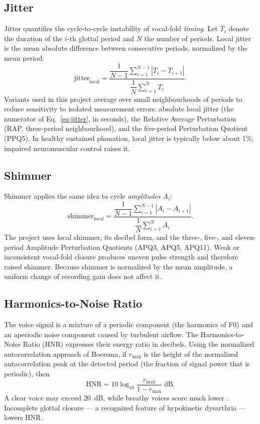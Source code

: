 \subsection{Jitter}

Jitter quantifies the cycle-to-cycle instability of vocal-fold
\emph{timing}. Let $T_i$ denote the duration of the $i$-th glottal
period and $N$ the number of periods. Local jitter is the mean absolute
difference between consecutive periods, normalized by the mean period:
\begin{equation}
\mathrm{jitter}_{\mathrm{local}} =
\frac{\dfrac{1}{N-1}\displaystyle\sum_{i=1}^{N-1}\left|T_i - T_{i+1}\right|}
     {\dfrac{1}{N}\displaystyle\sum_{i=1}^{N} T_i}.
\label{eq:jitter}
\end{equation}
Variants used in this project average over small neighbourhoods of
periods to reduce sensitivity to isolated measurement errors: absolute
local jitter (the numerator of Eq.~\ref{eq:jitter}, in seconds), the
Relative Average Perturbation (RAP, three-period neighbourhood), and
the five-period Perturbation Quotient (PPQ5). In healthy sustained
phonation, local jitter is typically below about 1\%; impaired
neuromuscular control raises it.

\subsection{Shimmer}

Shimmer applies the same idea to cycle \emph{amplitudes} $A_i$:
\begin{equation}
\mathrm{shimmer}_{\mathrm{local}} =
\frac{\dfrac{1}{N-1}\displaystyle\sum_{i=1}^{N-1}\left|A_i - A_{i+1}\right|}
     {\dfrac{1}{N}\displaystyle\sum_{i=1}^{N} A_i}.
\label{eq:shimmer}
\end{equation}
The project uses local shimmer, its decibel form, and the three-, five-,
and eleven-period Amplitude Perturbation Quotients (APQ3, APQ5, APQ11).
Weak or inconsistent vocal-fold closure produces uneven pulse strength
and therefore raised shimmer. Because shimmer is normalized by the mean
amplitude, a uniform change of recording gain does not affect it.

\subsection{Harmonics-to-Noise Ratio}

The voice signal is a mixture of a periodic component (the harmonics of
F0) and an aperiodic noise component caused by turbulent airflow. The
Harmonics-to-Noise Ratio (HNR) expresses their energy ratio in
decibels. Using the normalized autocorrelation approach of Boersma, if
$r_{\max}$ is the height of the normalized autocorrelation peak at the
detected period (the fraction of signal power that is periodic), then
\begin{equation}
\mathrm{HNR} = 10\log_{10}\frac{r_{\max}}{1-r_{\max}}\;\text{dB}.
\label{eq:hnr}
\end{equation}
A clear voice may exceed 20~dB, while breathy voices score much lower
\cite{boersma1993}. Incomplete glottal closure --- a recognized feature
of hypokinetic dysarthria --- lowers HNR.

